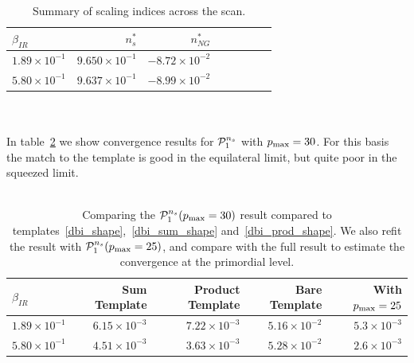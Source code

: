     \\
    \\
\begin{table}[h!]
  \begin{center}
    \begin{tabular}{lrrrrrrr}
        \toprule
        $\beta_{IR}$ &  $n_s^{*}$ &  $n_{NG}^{*}$\\
        \midrule
        $1.89\times 10^{-1}$  &  $9.650\times 10^{-1}$  &  $-8.72\times 10^{-2}$\\
        $5.80\times 10^{-1}$  &  $9.637\times 10^{-1}$  &  $-8.99\times 10^{-2}$\\
        \bottomrule
    \end{tabular}
    \caption{Summary of scaling indices across the scan.}\label{tab:scan_summary_ns}
  \end{center}
\end{table}
\\
\\
    In table~\ref{tab:template_errors} we show convergence results for $\mathcal{P}^{n_s}_1$ with $p_\text{max}=30$.
    For this basis the match to the template is good in the equilateral limit, but quite poor in the squeezed limit.
    \\
    \\
\begin{table}[h!]
  \begin{center}
    \begin{tabular}{lrrrr}
        \toprule
        $\beta_{IR}$ & Sum Template & Product Template & Bare Template & With $p_\text{max}=25$ \\
        \midrule
        $1.89\times 10^{-1}$  &  $6.15\times 10^{-3}$  &  $7.22\times 10^{-3}$  &  $5.16\times 10^{-2}$  &  $5.3\times 10^{-3}$ \\
        $5.80\times 10^{-1}$  &  $4.51\times 10^{-3}$  &  $3.63\times 10^{-3}$  &  $5.28\times 10^{-2}$  &  $2.6\times 10^{-3}$ \\
        \bottomrule
    \end{tabular}
    \caption{
        Comparing the $\mathcal{P}^{n_s}_1(p_\text{max}=30)$ result compared to
        templates~\eqref{dbi_shape},~\eqref{dbi_sum_shape} and~\eqref{dbi_prod_shape}.
        We also refit the result with $\mathcal{P}^{n_s}_1(p_\text{max}=25)$, and compare with the full
        result to estimate the convergence at the primordial level.
    }\label{tab:template_errors}
  \end{center}
\end{table}
    \\
    \\
